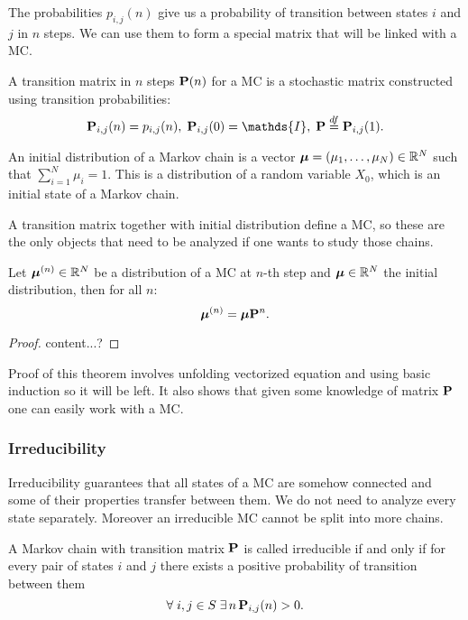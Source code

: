 	The probabilities $p_{i,j}(n)$ give us a probability of transition between states $i$ and $j$ in $n$  steps. We can use them to form a special matrix that will be linked with a MC.
	\begin{definition}
		A transition matrix in $n$ steps $\mathbf{P}(n)$ for a MC is a stochastic matrix constructed using transition probabilities:
		\begin{equation*}
			\PP_{i,j}(n) = p_{i,j}(n), \; \PP_{i,j}(0) = \mathds{I}, \; \PP \overset{df}{=} \PP_{i,j}(1).
		\end{equation*}
	\end{definition}
	
	\begin{definition}
		An initial distribution of a Markov chain is a vector $\bm{\mu} = (\mu_1, \ldots, \mu_N) \in \mathbb{R}^N$ such that $\sum_{i=1}^{N} \mu_i = 1$. This is a distribution of a random variable $X_0$, which is an initial state of a Markov chain.
	\end{definition}

	A transition matrix together with initial distribution define a MC, so these are the only objects that need to be analyzed if one wants to study those chains.
	
	\begin{theorem}
		Let $\bm{\mu}^{(n)} \in \mathbb{R}^N$ be a distribution of a MC at $n$-th step and $\bm{\mu} \in \mathbb{R}^N$ the initial distribution, then for all $n$:
		\begin{equation*}
			\bm{\mu}^{(n)} = \bm{\mu} \mathbf{P}^n.
		\end{equation*}
	\end{theorem}
	\begin{proof}
		content...?
	\end{proof}
	Proof of this theorem involves unfolding vectorized equation and using basic induction so it will be left. It also shows that given some knowledge of matrix $\mathbf{P}$ one can easily work with a MC.
	
	\subsubsection{Irreducibility}
		Irreducibility guarantees that all states of a MC are somehow connected and some of their properties transfer between them. We do not need to analyze every state separately. Moreover an irreducible MC cannot be split into more chains.
		\begin{definition}[Irreducibility]
			A Markov chain with transition matrix $\mathbf{P}$ is called irreducible if and only if for every pair of states $i$ and $j$ there exists a positive probability of transition between them \ie
			\begin{equation*}
				\forall \; i,j \in S \; \exists \, n \, \mathbf{P}_{i,j}(n) > 0.
			\end{equation*}
		\end{definition}
	

